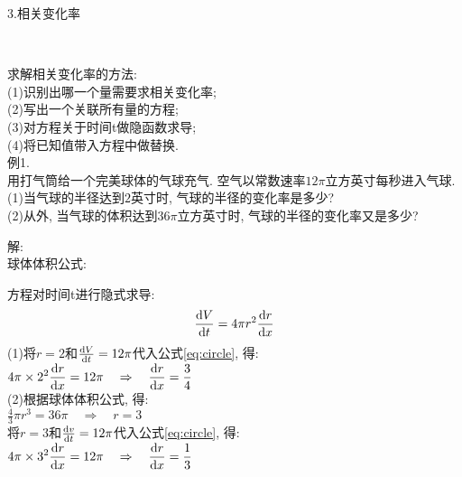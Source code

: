 3.相关变化率\\[-3ex]
\begin{center}
\\
\end{center}\vspace{-1ex}
\begin{center}
\end{center}
求解相关变化率的方法:\\
(1)识别出哪一个量需要求相关变化率;\\
(2)写出一个关联所有量的方程;\\
(3)对方程关于时间t做隐函数求导;\\
(4)将已知值带入方程中做替换.\\

例1.\\
用打气筒给一个完美球体的气球充气. 空气以常数速率$12\pi$立方英寸每秒进入气球.\\
(1)当气球的半径达到$2$英寸时, 气球的半径的变化率是多少?\\
(2)从外, 当气球的体积达到$36\pi$立方英寸时, 气球的半径的变化率又是多少?

解:\\
球体体积公式:\\[-2ex]
\begin{center}
\end{center}
方程对时间t进行隐式求导:
\begin{equation}
\displaystyle\frac{\mathop{}\!\mathrm{d} V}{\mathop{}\!\mathrm{d} t}=4\pi r^2\frac{\mathop{}\!\mathrm{d} r}{\mathop{}\!\mathrm{d} x}\label{eq:circle}
\end{equation}
(1)将$r=2$和$\frac{\mathop{}\!\mathrm{d} V}{\mathop{}\!\mathrm{d} t}=12\pi$代入公式\eqref{eq:circle}, 得:\\[1ex]
\phantom{(1)}$\displaystyle 4\pi\times 2^2\frac{\mathop{}\!\mathrm{d} r}{\mathop{}\!\mathrm{d} x}=12\pi\quad\Rightarrow\quad\frac{\mathop{}\!\mathrm{d} r}{\mathop{}\!\mathrm{d} x}=\frac{3}{4}$\\[1ex]
(2)根据球体体积公式, 得:\\[1ex]
\phantom{(2)}$\displaystyle\frac{4}{3}\pi r^3=36\pi\quad\Rightarrow\quad r=3$\\[1ex]
\phantom{(2)}将$r=3$和$\frac{\mathop{}\!\mathrm{d} v}{\mathop{}\!\mathrm{d} t}=12\pi$代入公式\eqref{eq:circle}, 得:\\[1ex]
\phantom{(2)}$\displaystyle 4\pi\times 3^2\frac{\mathop{}\!\mathrm{d} r}{\mathop{}\!\mathrm{d} x}=12\pi\quad\Rightarrow\quad\frac{\mathop{}\!\mathrm{d} r}{\mathop{}\!\mathrm{d} x}=\frac{1}{3}$\\[2ex]

